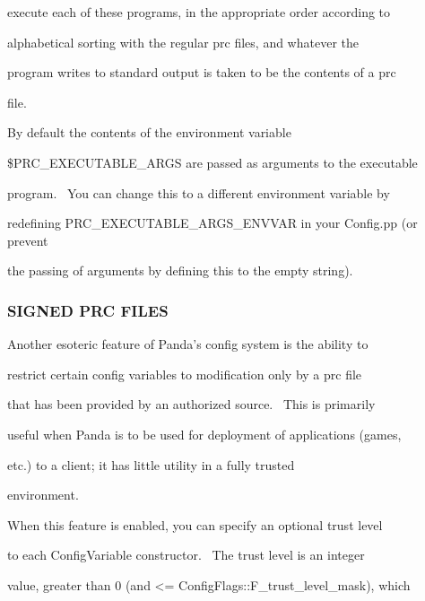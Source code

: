 \documentclass[a4paper]{article}
\begin{document}
{\color{black}
execute each of these programs, in the appropriate order according to}

{\color{black}
alphabetical sorting with the regular prc files, and whatever the}

{\color{black}
program writes to standard output is taken to be the contents of a prc}

{\color{black}
file.}


\bigskip

{\color{black}
By default the contents of the environment variable}

{\color{black}
\$PRC\_EXECUTABLE\_ARGS are passed as arguments to the executable}

{\color{black}
program. \ You can change this to a different environment variable by}

{\color{black}
redefining PRC\_EXECUTABLE\_ARGS\_ENVVAR in your Config.pp (or prevent}

{\color{black}
the passing of arguments by defining this to the empty string).}


\bigskip

\clearpage
\bigskip


\bigskip

\subsubsection[SIGNED PRC FILES]{SIGNED PRC FILES}
\hypertarget{RefHeading312461927442421}{}
\bigskip

{\color{black}
Another esoteric feature of Panda's config system is the ability to}

{\color{black}
restrict certain config variables to modification only by a prc file}

{\color{black}
that has been provided by an authorized source. \ This is primarily}

{\color{black}
useful when Panda is to be used for deployment of applications (games,}

{\color{black}
etc.) to a client; it has little utility in a fully trusted}

{\color{black}
environment.}


\bigskip

{\color{black}
When this feature is enabled, you can specify an optional trust level}

{\color{black}
to each ConfigVariable constructor. \ The trust level is an integer}

{\color{black}
value, greater than 0 (and {\textless}= ConfigFlags::F\_trust\_level\_mask), which}
\end{document}
